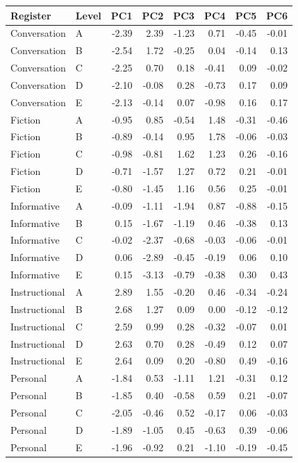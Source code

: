 \documentclass[
  letterpaper,
  DIV=11,
  numbers=noendperiod]{scrreprt}
\begin{document}
\begin{longtable}[]{@{}llrrrrrr@{}}
\toprule\noalign{}
Register & Level & PC1 & PC2 & PC3 & PC4 & PC5 & PC6 \\
\midrule\noalign{}
\endhead
\bottomrule\noalign{}
\endlastfoot
Conversation & A & -2.39 & 2.39 & -1.23 & 0.71 & -0.45 & -0.01 \\
Conversation & B & -2.54 & 1.72 & -0.25 & 0.04 & -0.14 & 0.13 \\
Conversation & C & -2.25 & 0.70 & 0.18 & -0.41 & 0.09 & -0.02 \\
Conversation & D & -2.10 & -0.08 & 0.28 & -0.73 & 0.17 & 0.09 \\
Conversation & E & -2.13 & -0.14 & 0.07 & -0.98 & 0.16 & 0.17 \\
Fiction & A & -0.95 & 0.85 & -0.54 & 1.48 & -0.31 & -0.46 \\
Fiction & B & -0.89 & -0.14 & 0.95 & 1.78 & -0.06 & -0.03 \\
Fiction & C & -0.98 & -0.81 & 1.62 & 1.23 & 0.26 & -0.16 \\
Fiction & D & -0.71 & -1.57 & 1.27 & 0.72 & 0.21 & -0.01 \\
Fiction & E & -0.80 & -1.45 & 1.16 & 0.56 & 0.25 & -0.01 \\
Informative & A & -0.09 & -1.11 & -1.94 & 0.87 & -0.88 & -0.15 \\
Informative & B & 0.15 & -1.67 & -1.19 & 0.46 & -0.38 & 0.13 \\
Informative & C & -0.02 & -2.37 & -0.68 & -0.03 & -0.06 & -0.01 \\
Informative & D & 0.06 & -2.89 & -0.45 & -0.19 & 0.06 & 0.10 \\
Informative & E & 0.15 & -3.13 & -0.79 & -0.38 & 0.30 & 0.43 \\
Instructional & A & 2.89 & 1.55 & -0.20 & 0.46 & -0.34 & -0.24 \\
Instructional & B & 2.68 & 1.27 & 0.09 & 0.00 & -0.12 & -0.12 \\
Instructional & C & 2.59 & 0.99 & 0.28 & -0.32 & -0.07 & 0.01 \\
Instructional & D & 2.63 & 0.70 & 0.28 & -0.49 & 0.12 & 0.07 \\
Instructional & E & 2.64 & 0.09 & 0.20 & -0.80 & 0.49 & -0.16 \\
Personal & A & -1.84 & 0.53 & -1.11 & 1.21 & -0.31 & 0.12 \\
Personal & B & -1.85 & 0.40 & -0.58 & 0.59 & 0.21 & -0.07 \\
Personal & C & -2.05 & -0.46 & 0.52 & -0.17 & 0.06 & -0.03 \\
Personal & D & -1.89 & -1.05 & 0.45 & -0.63 & 0.39 & -0.06 \\
Personal & E & -1.96 & -0.92 & 0.21 & -1.10 & -0.19 & -0.45 \\
\end{longtable}
\end{document}
